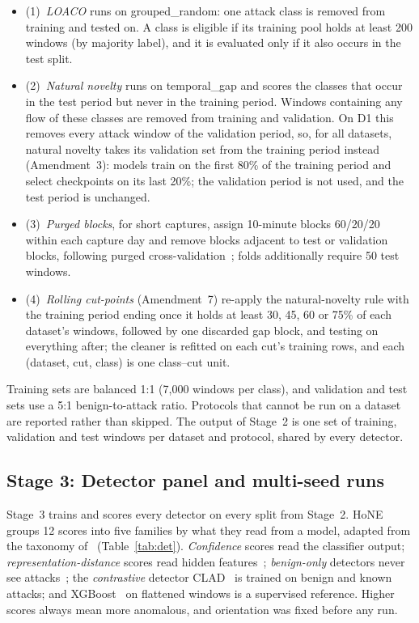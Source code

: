 \documentclass[conference]{IEEEtran}
\begin{document}
\begin{itemize}
\item (1)~\emph{LOACO} runs on grouped\_random: one attack class is removed from training and tested on. A class is eligible if its training pool holds at least 200 windows (by majority label), and it is evaluated only if it also occurs in the test split.
\item (2)~\emph{Natural novelty} runs on temporal\_gap and scores the classes that occur in the test period but never in the training period. Windows containing any flow of these classes are removed from training and validation. On D1 this removes every attack window of the validation period, so, for all datasets, natural novelty takes its validation set from the training period instead (Amendment~3): models train on the first 80\% of the training period and select checkpoints on its last 20\%; the validation period is not used, and the test period is unchanged.
\item (3)~\emph{Purged blocks}, for short captures, assign 10-minute blocks 60/20/20 within each capture day and remove blocks adjacent to test or validation blocks, following purged cross-validation~\cite{lopezdeprado2018}; folds additionally require 50 test windows.
\item (4)~\emph{Rolling cut-points} (Amendment~7) re-apply the natural-novelty rule with the training period ending once it holds at least 30, 45, 60 or 75\% of each dataset's windows, followed by one discarded gap block, and testing on everything after; the cleaner is refitted on each cut's training rows, and each (dataset, cut, class) is one class--cut unit.
\end{itemize}
Training sets are balanced 1:1 (7,000 windows per class), and validation and test sets use a 5:1 benign-to-attack ratio. Protocols that cannot be run on a dataset are reported rather than skipped. The output of Stage~2 is one set of training, validation and test windows per dataset and protocol, shared by every detector.

\subsection{Stage 3: Detector panel and multi-seed runs}
\label{sec:s3}
Stage~3 trains and scores every detector on every split from Stage~2. HoNE groups 12 scores into five families by what they read from a model, adapted from the taxonomy of~\cite{yang2024ood} (Table~\ref{tab:det}). \emph{Confidence} scores read the classifier output; \emph{representation-distance} scores read hidden features~\cite{lee2018,sun2022knn}; \emph{benign-only} detectors never see attacks~\cite{liu2008,scholkopf2001}; the \emph{contrastive} detector CLAD~\cite{wilkie2026} is trained on benign and known attacks; and XGBoost~\cite{chen2016} on flattened windows is a supervised reference. Higher scores always mean more anomalous, and orientation was fixed before any run.
\end{document}
